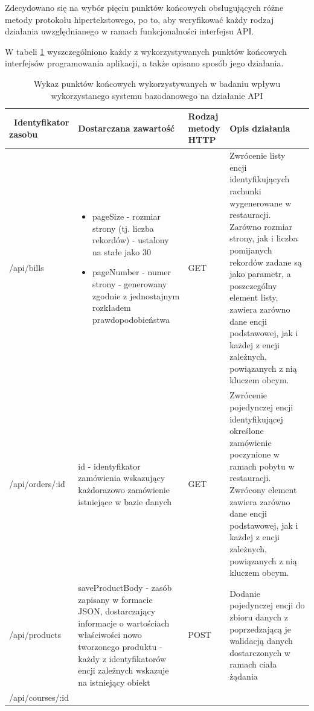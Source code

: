Zdecydowano się na wybór pięciu punktów końcowych obsługujących różne metody protokołu hipertekstowego, po to, aby weryfikować każdy rodzaj działania uwzględnianego w ramach funkcjonalności interfejsu API.

W tabeli \ref{tab:endpointy-scenario-1} wyszczególniono każdy z wykorzystywanych punktów końcowych interfejsów programowania aplikacji, a także opisano sposób jego działania.

\begin{table}[htbp] \small
    \centering
    \caption{Wykaz punktów końcowych wykorzystywanych w badaniu wpływu wykorzystanego systemu bazodanowego na działanie API}
    \label{tab:endpointy-scenario-1}
    \begin{tabularx}{\linewidth}{|X|X|X|X|} \hline\
        Identyfikator zasobu & Dostarczana zawartość & Rodzaj metody HTTP & Opis działania \\ \hline\hline
        /api/bills &
        \begin{itemize}
            \item pageSize - rozmiar strony (tj. liczba rekordów) - ustalony na stałe jako 30
            \item pageNumber - numer strony - generowany zgodnie z jednostajnym rozkładem prawdopodobieństwa
        \end{itemize} &
        GET &
        Zwrócenie listy encji identyfikujących rachunki wygenerowane w restauracji. Zarówno rozmiar strony, jak i liczba pomijanych rekordów zadane są jako parametr, a poszczególny element listy, zawiera zarówno dane encji podstawowej, jak i każdej z encji zależnych, powiązanych z nią kluczem obcym. \\ \hline
        /api/orders/:id & id - identyfikator zamówienia wskazujący każdorazowo zamówienie istniejące w bazie danych & GET & Zwrócenie pojedynczej encji identyfikującej określone zamówienie poczynione w ramach pobytu w restauracji. Zwrócony element zawiera zarówno dane encji podstawowej, jak i każdej z encji zależnych, powiązanych z nią kluczem obcym.\\ \hline
        /api/products & saveProductBody - zasób zapisany w formacie JSON, dostarczający informacje o wartościach właściwości nowo tworzonego produktu - każdy z identyfikatorów encji zależnych wskazuje na istniejący obiekt & POST & Dodanie pojedynczej encji do zbioru danych z poprzedzającą je walidacją danych dostarczonych w ramach ciała żądania \\ \hline
        /api/courses/:id & \begin{itemize}

\end{itemize}
\end{tabularx}
\end{table}
